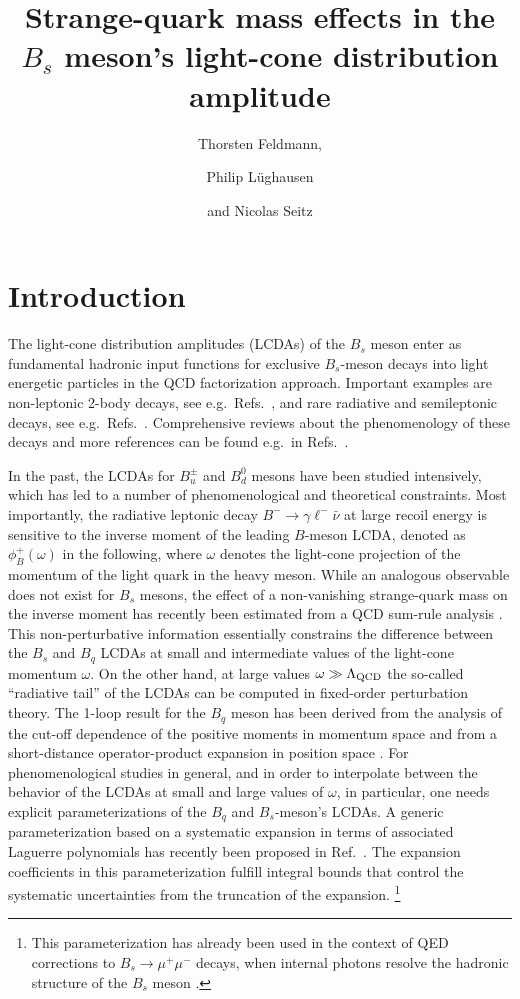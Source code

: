 \documentclass[a4paper,11pt]{article}
\title{\boldmath%
Strange-quark mass effects in the $B_s$ meson's light-cone distribution amplitude
}
\author{Thorsten Feldmann,}
\author{Philip L\"ughausen}
\author{and Nicolas Seitz}
\affiliation{%
Theoretische Physik 1,
Universität Siegen,\\
Walter-Flex-Straße 3,
D-57068 Siegen, Germany
}
\begin{document}

\maketitle

\section{Introduction}

The light-cone distribution amplitudes (LCDAs) of the $B_s$ meson
enter as fundamental hadronic input functions for exclusive $B_s$-meson decays into light energetic particles in the QCD factorization approach. Important examples are non-leptonic 2-body decays, see e.g.\ Refs.~\cite{Beneke:2003zv,Williamson:2006hb,Cheng:2009mu,Huber:2021cgk}, and rare radiative and semileptonic decays, see e.g.\ Refs.~\cite{Ali:2007sj,Beneke:2020fot}.
Comprehensive reviews about the phenomenology of these decays and more references can be found e.g.\ in Refs.~\cite{LHCb:2012myk,Belle-II:2018jsg}.


In the past, the LCDAs for $B_u^\pm$ and $B_d^0$ mesons have been studied intensively, which has led to a number of phenomenological and theoretical constraints. Most importantly, the radiative leptonic decay $B^-\to \gamma \ell^- \bar \nu$ at large recoil energy is sensitive to the inverse moment of the leading $B$-meson LCDA, denoted as $\phi_B^+(\omega)$ in the following, where $\omega$ denotes the light-cone projection of the momentum of the 
light quark in the heavy meson.
%
While an analogous observable does not exist for $B_s$ mesons, the effect of a non-vanishing strange-quark mass on the inverse moment has recently been estimated from a QCD sum-rule analysis \cite{Khodjamirian:2020hob}. This non-perturbative information essentially constrains the difference between the $B_s$ and $B_q$ LCDAs at small and intermediate values of the light-cone momentum $\omega$.
%
On the other hand, at large values $\omega \gg\Lambda_{\rm QCD}$ the so-called ``radiative tail'' of the LCDAs can be computed in fixed-order perturbation theory. The 1-loop result for the $B_q$ meson has been derived from the analysis of the cut-off dependence of the positive moments in momentum space \cite{Lee:2005gza} and from a short-distance operator-product expansion in position space \cite{Kawamura:2008vq}.
%
For phenomenological studies in general, and in order to interpolate between the behavior of the LCDAs at small and large values of $\omega$, in particular, one needs explicit parameterizations of the $B_q$ and $B_s$-meson's LCDAs. A generic parameterization based on a systematic expansion in terms of associated Laguerre polynomials has recently been proposed in Ref.~\cite{Feldmann:2022uok}. The expansion coefficients in this parameterization fulfill integral bounds that control the systematic uncertainties from the truncation of the expansion.%
\footnote{%
This parameterization has already been used \cite{Feldmann:2022ixt} in the context of QED corrections to $B_s \to \mu^+\mu^-$ decays, when internal photons resolve the hadronic structure of the $B_s$ meson \cite{Beneke:2017vpq}.
}
%
\end{document}
